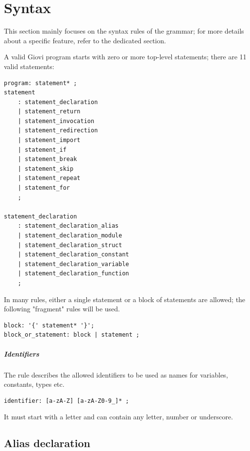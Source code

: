 \chapter{Syntax}
\label{ch:syntax}

This section mainly focuses on the syntax rules of the grammar; for more
details about a specific feature, refer to the dedicated section.

\vspace{\baselineskip}

A valid Giovi program starts with zero or more top-level statements; there are
11 valid statements:

\begin{verbatim}
program: statement* ;
statement
	: statement_declaration
	| statement_return
	| statement_invocation
	| statement_redirection
	| statement_import
	| statement_if
	| statement_break
	| statement_skip
	| statement_repeat
	| statement_for
	;

statement_declaration
	: statement_declaration_alias
	| statement_declaration_module
	| statement_declaration_struct
	| statement_declaration_constant
	| statement_declaration_variable
	| statement_declaration_function
	;
\end{verbatim}

In many rules, either a single statement or a block of statements are allowed;
the following "fragment" rules will be used.

\begin{verbatim}
block: '{' statement* '}';
block_or_statement: block | statement ;
\end{verbatim}

\paragraph{Identifiers} The  rule describes the allowed
identifiers to be used as names for variables, constants, types etc.

\begin{verbatim}
identifier: [a-zA-Z] [a-zA-Z0-9_]* ;
\end{verbatim}

It must start with a letter and can contain any letter, number or underscore.

\clearpage

\section{Alias declaration}


